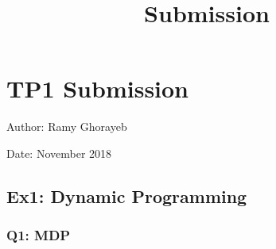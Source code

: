 \documentclass[11pt]{article}
\title{Submission}
\begin{document}
    
    
    \maketitle
    
    

    
    \section{TP1 Submission}\label{tp1-submission}

Author: Ramy Ghorayeb

Date: November 2018

    \subsection{Ex1: Dynamic Programming}\label{ex1-dynamic-programming}

\subsubsection{Q1: MDP}\label{q1-mdp}
\end{document}
